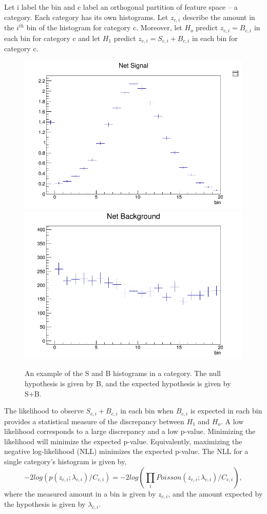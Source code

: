 \documentclass[review]{elsarticle}
\begin{document}
Let i label the bin and c label an orthogonal partition of feature space -- a category. Each category has its own histograms. Let $z_{c,i}$ describe the amount in the $i^{th}$ bin of the histogram for category c. Moreover, let $H_o$ predict $z_{c,i} = B_{c,i}$ in each bin for category c and let $H_1$ predict $z_{c,i} = S_{c,i} + B_{c,i}$ in each bin for category c.
\begin{figure}[hbp]
  \centering
  \includegraphics[width=0.49\linewidth]{binning_signal_example.png}
  \includegraphics[width=0.49\linewidth]{binning_bg_example.png}
  \caption
  {An example of the S and B histograms in a category. The null hypothesis is given by B, and the expected hypothesis is given by S+B.}
  \label{fig:binning_example}
\end{figure}

The likelihood to observe $S_{c,i} + B_{c,i}$ in each bin when $B_{c,i}$ is expected in each bin provides a statistical measure of the discrepancy between $H_1$ and $H_o$. A low likelihood corresponds to a large discrepancy and a low p-value. Minimizing the likelihood will minimize the expected p-value. Equivalently, maximizing the negative log-likelihood (NLL) minimizes the expected p-value. The NLL for a single category's histogram is given by,  
\begin{equation}
\label{first}
-2log\left( p(z_{c,i}; \lambda_{c,i})/ C_{c,i} \right)  = -2log\left( \prod_{i} Poisson(z_{c,i}; \lambda_{c,i})/C_{c,i} \right),
\end{equation}
where the measured amount in a bin is given by $z_{c,i}$, and the amount expected by the hypothesis is given by $\lambda_{c,i}$. 
\end{document}

